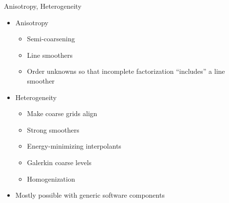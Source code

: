 \begin{frame}{Anisotropy, Heterogeneity}
  \begin{itemize}
  \item Anisotropy
    \begin{itemize}
    \item Semi-coarsening
    \item Line smoothers
    \item Order unknowns so that incomplete factorization ``includes'' a line smoother
    \end{itemize}
  \item Heterogeneity
    \begin{itemize}
    \item Make coarse grids align
    \item Strong smoothers
    \item Energy-minimizing interpolants
    \item Galerkin coarse levels
    \item Homogenization
    \end{itemize}
  \item Mostly possible with generic software components
  \end{itemize}
\end{frame}
